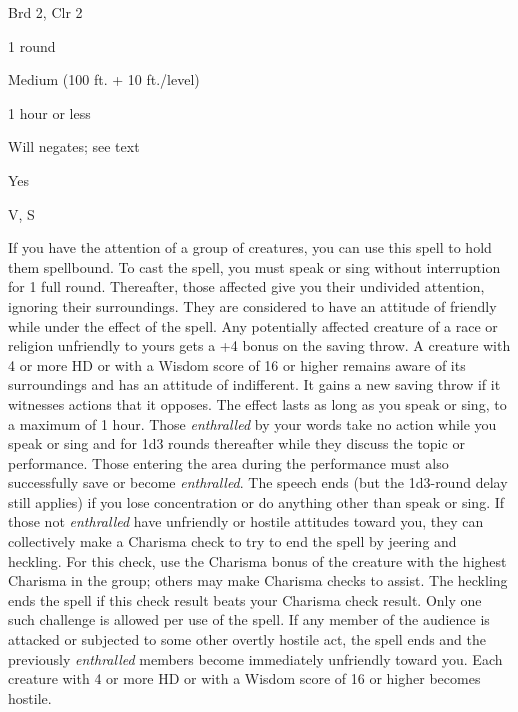 
\begin{description*}
\item[Level:] Brd 2, Clr 2
\item[Casting Time:] 1 round
\item[Range:] Medium (100 ft. + 10 ft./level)
\item[Duration:] 1 hour or less
\item[Saving Throw:] Will negates; see text
\item[Spell Resistance:] Yes
\item[Components:] V, S
\end{description*}

If you have the attention of a group of creatures, you can use this spell to hold
them spellbound. To cast the spell, you must speak or sing without interruption
for 1 full round. Thereafter, those affected give you their undivided attention,
ignoring their surroundings. They are considered to have an attitude of friendly
while under the effect of the spell. Any potentially affected creature of a race
or religion unfriendly to yours gets a +4 bonus on the saving throw.
A creature with 4 or more HD or with a Wisdom score of 16 or higher remains aware
of its surroundings and has an attitude of indifferent. It gains a new saving throw
if it witnesses actions that it opposes.
The effect lasts as long as you speak or sing, to a maximum of 1 hour. Those \textit{enthralled
}by your words take no action while you speak or sing and for 1d3 rounds thereafter
while they discuss the topic or performance. Those entering the area during the
performance must also successfully save or become \textit{enthralled}. The speech
ends (but the 1d3-round delay still applies) if you lose concentration or do anything
other than speak or sing.
If those not \textit{enthralled} have unfriendly or hostile attitudes toward you,
they can collectively make a Charisma check to try to end the spell by jeering
and heckling. For this check, use the Charisma bonus of the creature with the highest
Charisma in the group; others may make Charisma checks to assist. The heckling
ends the spell if this check result beats your Charisma check result. Only one
such challenge is allowed per use of the spell.
If any member of the audience is attacked or subjected to some other overtly hostile
act, the spell ends and the previously \textit{enthralled} members become immediately
unfriendly toward you. Each creature with 4 or more HD or with a Wisdom score of
16 or higher becomes hostile.